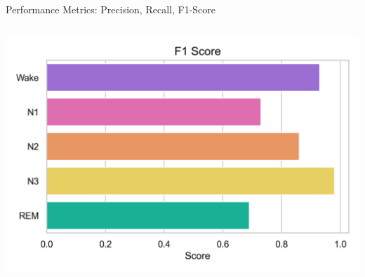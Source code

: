 \begin{frame}{Performance Metrics: Precision, Recall, F1-Score}
\begin{columns}
        \centering
        \includegraphics[width=\linewidth]{figures/f1_score_plot.png} %
    \end{columns}

\end{frame}

